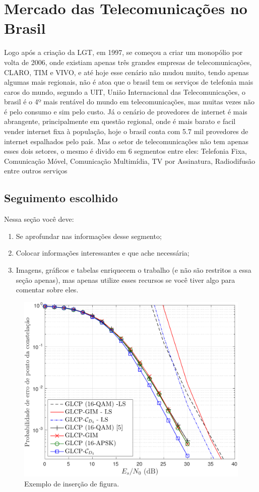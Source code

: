 \documentclass{sbrt2018port}
\begin{document}
\section{Mercado das Telecomunicações no Brasil}
\label{s_mercadoBrasil}
Logo após a criação da LGT, em 1997, se começou a criar um monopólio por volta de 2006, onde existiam apenas três grandes empresas de telecomunicações, CLARO, TIM e VIVO, e até hoje esse cenário não mudou muito, tendo apenas algumas mais regionais, não é atoa que o brasil tem os serviços de telefonia mais caros do mundo, segundo a UIT, União Internacional das Telecomunicações, o brasil é o 4º mais rentável do mundo em telecomunicações, mas muitas vezes não é pelo consumo e sim pelo custo.
Já o cenário de provedores de internet é mais abrangente, principalmente em questão regional, onde é mais barato e facil vender internet fixa à população, hoje o brasil conta com 5.7 mil provedores de internet espalhados pelo país.
Mas o setor de telecomunicações não tem apenas esses dois setores, o mesmo é divido em 6 segmentos entre eles: Telefonia Fixa, Comunicação Móvel, Comunicação Multimídia, TV por Assinatura, Radiodifusão entre outros serviços

\subsection{Seguimento escolhido}
\label{s_segmento}

Nessa seção você deve:
\begin{enumerate}
    \item Se aprofundar nas informações desse segmento;
    \item Colocar informações interessantes e que ache necessária;
    \item Imagens, gráficos e tabelas enriquecem o trabalho (e não são restritos a essa seção apenas), mas apenas utilize esses recursos se você tiver algo para comentar sobre eles.
\end{enumerate}


\begin{figure}[!ht]%
    \centering
    \includegraphics[width=\linewidth]{CER_schemesD2.pdf}
    \caption{Exemplo de inserção de figura.}
    \label{f_cerd2}
\end{figure}
\end{document}
